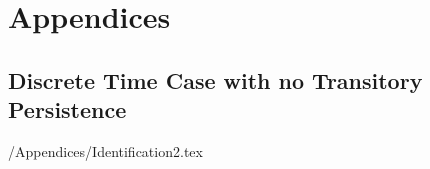 \documentclass[titlepage,abstract]{econtex}
\begin{document}
\section{Appendices}



\subsection{Discrete Time Case with no Transitory Persistence}

\econtexRoot/Appendices/Identification2.tex

\textbf{}	
\end{document}
